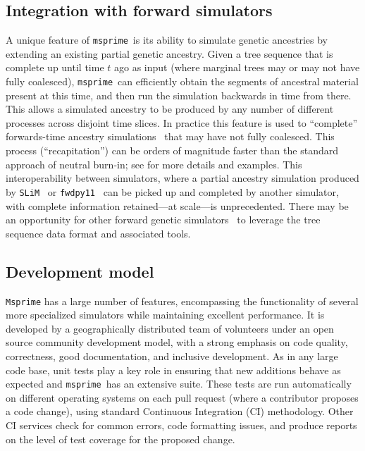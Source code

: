 \documentclass[9pt,twocolumn,twoside,lineno]{gsajnl}
\newcommand{\msprime}[0]{\texttt{msprime}}
\newcommand{\SLiM}[0]{\texttt{SLiM}}
\newcommand{\fwdpy}[0]{\texttt{fwdpy11}}
\begin{document}
\subsection*{Integration with forward simulators}
A unique feature of \msprime\ is its ability to simulate
genetic ancestries by extending an existing partial
genetic ancestry. Given a tree sequence that
is complete up until time $t$ ago as input
(where marginal trees may or may not have fully coalesced),
\msprime\ can efficiently obtain the segments of ancestral material
present at this time, and then run the simulation backwards in time from there.
This allows a simulated ancestry to be produced by any
number of different processes across disjoint time slices.
In practice this feature is used to ``complete''
forwards-time ancestry simulations~\citep{kelleher2018efficient}
that may have not fully coalesced. This process
(``recapitation'') can be orders of magnitude faster than
the standard approach of neutral burn-in; see
\cite{haller2018tree} for more details and examples.
This interoperability between simulators, where a partial ancestry
simulation produced by \SLiM~\citep{haller2019slim}
or \fwdpy~\citep{thornton2014cpp} can be picked up and completed
by another simulator, with complete information
retained---at scale---is unprecedented.
There may be an opportunity for
other forward genetic simulators~\citep[e.g.][]{gaynor2021alphasimr}
to leverage the tree sequence data format and associated tools.

\subsection*{Development model}
\texttt{Msprime} has a large number of features, encompassing
the functionality of several more specialized simulators
while maintaining excellent performance.
It is developed by a geographically distributed team of volunteers under an
open source community development model, with a strong emphasis
on code quality, correctness, good documentation, and inclusive development.
As in any large code base,
unit tests play a key role in ensuring that new additions behave
as expected and \msprime\ has an extensive suite.
These tests are run
automatically on different operating systems on each pull request
(where a contributor proposes a code change), using standard Continuous
Integration (CI) methodology. Other CI services
check for common errors, code formatting issues, and produce reports on
the level of test coverage for the proposed change.
\end{document}

